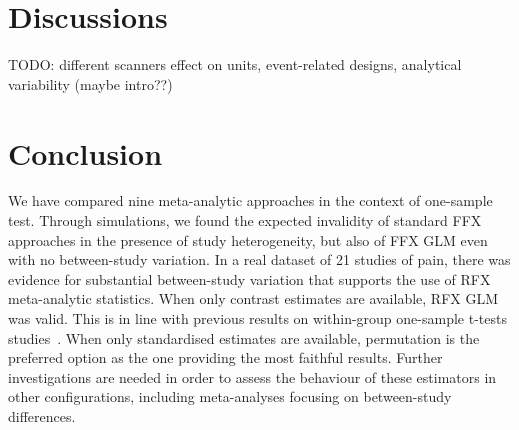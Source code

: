 \documentclass[preprint]{elsarticle}
\begin{document}




\section{Discussions}\label{sec:discussion}    
TODO: different scanners effect on units, event-related designs, analytical variability (maybe intro??)

\section{Conclusion}\label{sec_ccl}
We have compared nine meta-analytic approaches in the context of one-sample test. Through simulations, we found the expected invalidity of standard FFX approaches in the presence of study heterogeneity, but also of FFX GLM even with no between-study variation. In a real dataset of 21 studies of pain, there was evidence for substantial between-study variation that supports the use of RFX meta-analytic statistics. When only contrast estimates are available, RFX GLM was valid. This is in line with previous results on within-group one-sample t-tests studies~\cite{Mumford2009}. When only standardised estimates are available, permutation is the preferred option as the one providing the most faithful results. Further investigations are needed in order to assess the behaviour of these estimators in other configurations, including meta-analyses focusing on between-study differences.
\end{document}
